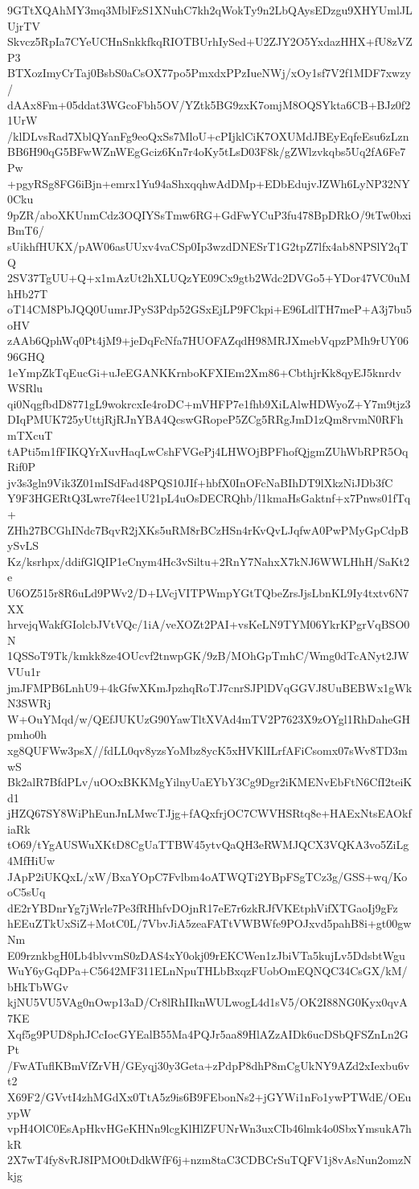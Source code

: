 9GTtXQAhMY3mq3MblFzS1XNuhC7kh2qWokTy9n2LbQAysEDzgu9XHYUmlJLUjrTV
Skvcz5RpIa7CYeUCHnSnkkfkqRIOTBUrhIySed+U2ZJY2O5YxdazHHX+fU8zVZP3
BTXozImyCrTaj0BsbS0aCsOX77po5PmxdxPPzIueNWj/xOy1sf7V2f1MDF7xwzy/
dAAx8Fm+05ddat3WGcoFbh5OV/YZtk5BG9zxK7omjM8OQSYkta6CB+BJz0f21UrW
/klDLvsRad7XblQYanFg9eoQxSs7MloU+cPIjklCiK7OXUMdJBEyEqfeEsu6zLzn
BB6H90qG5BFwWZnWEgGciz6Kn7r4oKy5tLsD03F8k/gZWlzvkqbs5Uq2fA6Fe7Pw
+pgyRSg8FG6iBjn+emrx1Yu94aShxqqhwAdDMp+EDbEdujvJZWh6LyNP32NY0Cku
9pZR/aboXKUnmCdz3OQIYSsTmw6RG+GdFwYCuP3fu478BpDRkO/9tTw0bxiBmT6/
sUikhfHUKX/pAW06asUUxv4vaCSp0Ip3wzdDNESrT1G2tpZ7lfx4ab8NPSlY2qTQ
2SV37TgUU+Q+x1mAzUt2hXLUQzYE09Cx9gtb2Wdc2DVGo5+YDor47VC0uMhHb27T
oT14CM8PbJQQ0UumrJPyS3Pdp52GSxEjLP9FCkpi+E96LdlTH7meP+A3j7bu5oHV
zAAb6QphWq0Pt4jM9+jeDqFcNfa7HUOFAZqdH98MRJXmebVqpzPMh9rUY0696GHQ
1eYmpZkTqEucGi+uJeEGANKKrnboKFXIEm2Xm86+CbthjrKk8qyEJ5knrdvWSRlu
qi0NqgfbdD8771gL9wokrcxIe4roDC+mVHFP7e1fhb9XiLAlwHDWyoZ+Y7m9tjz3
DIqPMUK725yUttjRjRJnYBA4QcswGRopeP5ZCg5RRgJmD1zQm8rvmN0RFhmTXcuT
tAPti5m1fFIKQYrXuvHaqLwCshFVGePj4LHWOjBPFhofQjgmZUhWbRPR5OqRif0P
jv3s3gln9Vik3Z01mISdFad48PQS10JIf+hbfX0InOFcNaBIhDT9lXkzNiJDb3fC
Y9F3HGERtQ3Lwre7f4ee1U21pL4uOsDECRQhb/l1kmaHsGaktnf+x7Pnws01fTq+
ZHh27BCGhINdc7BqvR2jXKs5uRM8rBCzHSn4rKvQvLJqfwA0PwPMyGpCdpBySvLS
Kz/ksrhpx/ddifGlQIP1eCnym4Hc3vSiltu+2RnY7NahxX7kNJ6WWLHhH/SaKt2e
U6OZ515r8R6uLd9PWv2/D+LVcjVITPWmpYGtTQbeZrsJjsLbnKL9Iy4txtv6N7XX
hrvejqWakfGIolcbJVtVQc/1iA/veXOZt2PAI+vsKeLN9TYM06YkrKPgrVqBSO0N
1QSSoT9Tk/kmkk8ze4OUcvf2tnwpGK/9zB/MOhGpTmhC/Wmg0dTcANyt2JWVUu1r
jmJFMPB6LnhU9+4kGfwXKmJpzhqRoTJ7cnrSJPlDVqGGVJ8UuBEBWx1gWkN3SWRj
W+OuYMqd/w/QEfJUKUzG90YawTltXVAd4mTV2P7623X9zOYgl1RhDaheGHpmho0h
xg8QUFWw3psX//fdLL0qv8yzsYoMbz8ycK5xHVKlILrfAFiCsomx07sWv8TD3mwS
Bk2alR7BfdPLv/uOOxBKKMgYilnyUaEYbY3Cg9Dgr2iKMENvEbFtN6CfI2teiKd1
jHZQ67SY8WiPhEunJnLMwcTJjg+fAQxfrjOC7CWVHSRtq8e+HAExNtsEAOkfiaRk
tO69/tYgAUSWuXKtD8CgUaTTBW45ytvQaQH3eRWMJQCX3VQKA3vo5ZiLg4MfHiUw
JApP2iUKQxL/xW/BxaYOpC7Fvlbm4oATWQTi2YBpFSgTCz3g/GSS+wq/KooC5sUq
dE2rYBDnrYg7jWrle7Pe3fRHhfvDOjnR17eE7r6zkRJfVKEtphVifXTGaoIj9gFz
hEEuZTkUxSiZ+MotC0L/7VbvJiA5zeaFATtVWBWfe9POJxvd5pahB8i+gt00gwNm
E09rznkbgH0Lb4blvvmS0zDAS4xY0okj09rEKCWen1zJbiVTa5kujLv5DdsbtWgu
WuY6yGqDPa+C5642MF311ELnNpuTHLbBxqzFUobOmEQNQC34CsGX/kM/bHkTbWGv
kjNU5VU5VAg0nOwp13aD/Cr8lRhIIknWULwogL4d1sV5/OK2I88NG0Kyx0qvA7KE
Xqf5g9PUD8phJCcIocGYEalB55Ma4PQJr5aa89HlAZzAIDk6ucDSbQFSZnLn2GPt
/FwATuflKBmVfZrVH/GEyqj30y3Geta+zPdpP8dhP8mCgUkNY9AZd2xIexbu6vt2
X69F2/GVvtI4zhMGdXx0TtA5z9is6B9FEbonNs2+jGYWi1nFo1ywPTWdE/OEuypW
vpH4OlC0EsApHkvHGeKHNn9lcgKlHlZFUNrWn3uxCIb46lmk4o0SbxYmsukA7hkR
2X7wT4fy8vRJ8IPMO0tDdkWfF6j+nzm8taC3CDBCrSuTQFV1j8vAsNun2omzNkjg
